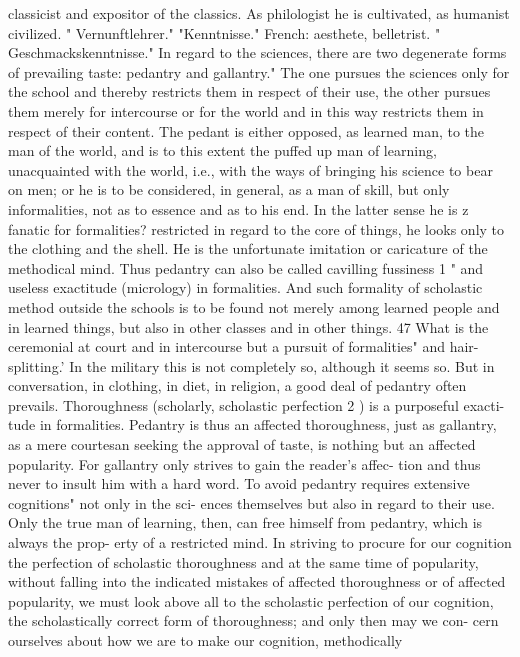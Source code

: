 classicist and expositor of the classics. As philologist he is cultivated, as
humanist civilized.
" Vernunftlehrer."
"Kenntnisse."
French: aesthete, belletrist.
" Geschmackskenntnisse."
In regard to the sciences, there are two degenerate forms of prevailing
taste: pedantry and gallantry." The one pursues the sciences only for the
school and thereby restricts them in respect of their use, the other pursues
them merely for intercourse or for the world and in this way restricts them
in respect of their content.
The pedant is either opposed, as learned man, to the man of the world,
and is to this extent the puffed up man of learning, unacquainted with the
world, i.e., with the ways of bringing his science to bear on men; or he is to
be considered, in general, as a man of skill, but only informalities, not as to
essence and as to his end. In the latter sense he is z fanatic for formalities?
restricted in regard to the core of things, he looks only to the clothing and
the shell. He is the unfortunate imitation or caricature of the methodical
mind. Thus pedantry can also be called cavilling fussiness 1 " and useless
exactitude (micrology) in formalities. And such formality of scholastic
method outside the schools is to be found not merely among learned
people and in learned things, but also in other classes and in other things. 47
What is the ceremonial at court and in intercourse but a pursuit of formalities"
and hair-splitting.' In the military this is not completely so, although it
seems so. But in conversation, in clothing, in diet, in religion, a good deal
of pedantry often prevails.
Thoroughness (scholarly, scholastic perfection 2 ) is a purposeful exacti-
tude in formalities. Pedantry is thus an affected thoroughness, just as
gallantry, as a mere courtesan seeking the approval of taste, is nothing but
an affected popularity. For gallantry only strives to gain the reader's affec-
tion and thus never to insult him with a hard word.
To avoid pedantry requires extensive cognitions" not only in the sci-
ences themselves but also in regard to their use. Only the true man of
learning, then, can free himself from pedantry, which is always the prop-
erty of a restricted mind.
In striving to procure for our cognition the perfection of scholastic
thoroughness and at the same time of popularity, without falling into the
indicated mistakes of affected thoroughness or of affected popularity, we
must look above all to the scholastic perfection of our cognition, the
scholastically correct form of thoroughness; and only then may we con-
cern ourselves about how we are to make our cognition, methodically
